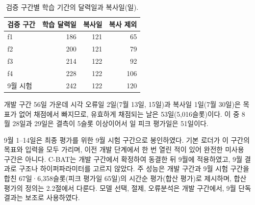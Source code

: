 \begin{table}[htbp]
\centering
\hwptablefont
\caption{검증 구간별 학습 기간의 달력일과 복사일(일).}\label{tab:ch1-copies}
\begin{tabular}{lrrr}
\toprule
검증 구간 & 학습 달력일 & 복사일 & 복사 제외 \\
\midrule
f1 & 186 & 121 & 65 \\
f2 & 200 & 121 & 79 \\
f3 & 214 & 122 & 92 \\
f4 & 228 & 122 & 106 \\
9월 시험 & 242 & 122 & 120 \\
\bottomrule
\end{tabular}
\end{table}

개발 구간 56일 가운데 시각 오류일 2일(7월 13일, 15일)과 복사일 1일(7월 30일)은 목표가 없어 채점에서 빠지므로, 유효하게 채점되는 날은 53일(5,016슬롯)이다. 이 중 8월 28일과 29일은 결측이 5슬롯 이상이어서 일 피크 평가일은 51일이다.

9월 1--14일은 최종 평가를 위한 9월 시험 구간으로 봉인하였다. 기본 로더가 이 구간의 목표와 입력을 모두 가리며, 이전 개발 단계에서 한 번 열린 적이 있어 완전한 미사용 구간은 아니다. C-BAT는 개발 구간에서 확정하여 동결한 뒤 9월에 적용하였고, 9월 결과로 구조나 하이퍼파라미터를 고르지 않았다. 주 성능은 개발 구간과 9월 시험 구간을 합친 67일·6,358슬롯(피크 평가일 65일)의 시간순 평가(합산 평가)로 제시하며, 합산 평가의 정의는 2.2절에서 다룬다. 모델 선택, 절제, 오류분석은 개발 구간에서, 9월 단독 결과는 보조로 사용하였다.
